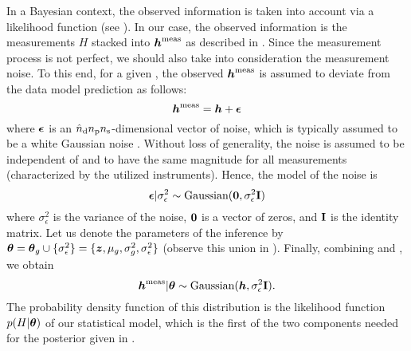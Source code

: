 In a Bayesian context, the observed information is taken into account via a
likelihood function (see ). In our case, the observed
information is the measurements $H$ stacked into $\boldsymbol{h}^{\mathrm{meas}}$ as described
in . Since the measurement process is not perfect, we should
also take into consideration the measurement noise. To this end, for a given
\g, the observed $\boldsymbol{h}^{\mathrm{meas}}$ is assumed to deviate from the data model
prediction \vh as follows:
\begin{equation} \elab{noisy-measurements}
  \vh^\measured = \vh + \v{\epsilon}
\end{equation}
where $\boldsymbol{\epsilon}$ is an ${\hat{n}_\mathrm{d}} {n_\mathrm{p}} {n_\mathrm{s}}$-dimensional vector of noise, which is
typically assumed to be a white Gaussian noise \cite{rasmussen2006,
marzouk2009}. Without loss of generality, the noise is assumed to be independent
of \g and to have the same magnitude for all measurements (characterized by the
utilized instruments). Hence, the model of the noise is
\begin{equation} \elab{noise-model}
  \v{\epsilon} | \sigma^2_\epsilon \sim \text{Gaussian}(\v{0}, \sigma^2_\epsilon \m{I})
\end{equation}
where $\sigma^2_\epsilon$ is the variance of the noise, $\boldsymbol{0}$ is a vector of
zeros, and $\mathbf{I}$ is the identity matrix. Let us denote the parameters of the
inference by $\boldsymbol{\theta} = \boldsymbol{\theta}_g \cup \{ \sigma_\epsilon^2 \} = \{ \boldsymbol{z}, \mu_g,
\sigma_g^2, \sigma_\epsilon^2 \}$ (observe this union in ).
Finally, combining  and , we obtain
\begin{equation} \elab{likelihood}
  \vh^\measured | \vt \sim \text{Gaussian}(\vh, \sigma_\epsilon^2 \m{I}).
\end{equation}
The probability density function of this distribution is the likelihood function
$p(H | \boldsymbol{\theta})$ of our statistical model, which is the first of the two components
needed for the posterior given in .

